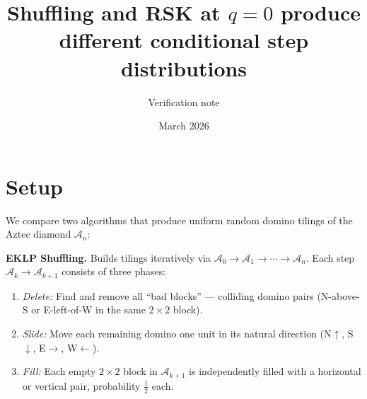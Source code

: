\documentclass[letterpaper,11pt,oneside]{article}
\title{Shuffling and RSK at $q=0$ produce different conditional step distributions}
\author{Verification note}
\date{March 2026}
\newcommand{\AZ}{\mathcal{A}}
\begin{document}
\maketitle


\newcommand{\hdom}[3]{\fill[#3] (#1,#2) rectangle ++(2,1);}
\newcommand{\vdom}[3]{\fill[#3] (#1,#2) rectangle ++(1,2);}
\newcommand{\aztecTwoBoundary}{
  (1,0) -- (3,0) -- (3,1) -- (4,1) -- (4,3) -- (3,3) -- (3,4) -- (1,4) --
  (1,3) -- (0,3) -- (0,1) -- (1,1) -- cycle
}
\newcommand{\aztecThreeBoundary}{
  (2,0) -- (4,0) -- (4,1) -- (5,1) -- (5,2) -- (6,2) -- (6,4) -- (5,4) --
  (5,5) -- (4,5) -- (4,6) -- (2,6) -- (2,5) -- (1,5) -- (1,4) -- (0,4) --
  (0,2) -- (1,2) -- (1,1) -- (2,1) -- cycle
}

\section{Setup}

We compare two algorithms that produce uniform random domino tilings of the
Aztec diamond $\AZ_n$:

\smallskip

\noindent\textbf{EKLP Shuffling.}
Builds tilings iteratively via $\AZ_0 \to \AZ_1 \to \cdots \to \AZ_n$.
Each step $\AZ_k \to \AZ_{k+1}$ consists of three phases:
\begin{enumerate}
  \item \emph{Delete:} Find and remove all ``bad blocks'' --- colliding
    domino pairs (N-above-S or E-left-of-W in the same $2\times 2$ block).
  \item \emph{Slide:} Move each remaining domino one unit in its natural
    direction (N$\uparrow$, S$\downarrow$, E$\to$, W$\leftarrow$).
  \item \emph{Fill:} Each empty $2\times 2$ block in $\AZ_{k+1}$ is
    independently filled with a horizontal or vertical pair, probability $\tfrac12$ each.
\end{enumerate}
\end{document}
